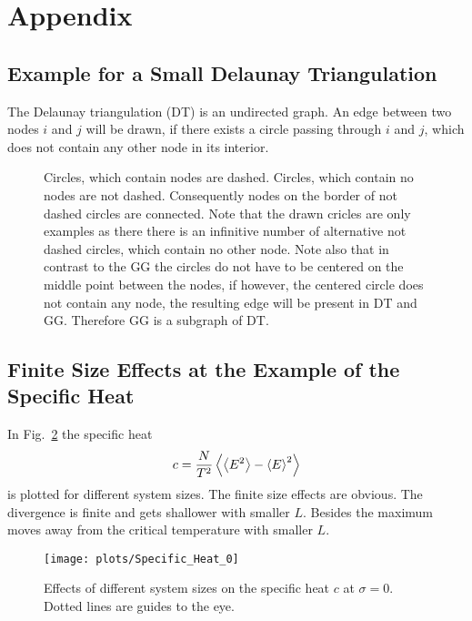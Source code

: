 \section{Appendix}
\subsection{Example for a Small Delaunay Triangulation}
\label{appendix:DT_def}
    The Delaunay triangulation (DT) is an undirected graph. An edge
    between two nodes \(i\) and \(j\) will be drawn, if there exists
    a circle passing through \(i\) and \(j\), which does not contain
    any other node in its interior.
    \begin{figure}[htbp]
    \centering
        
        \label{sfig:def:DT}
        \caption[Example for a Small Delaunay Triangulation]
        {
            Circles, which contain nodes are dashed.
            Circles, which contain no nodes are not dashed.
            Consequently nodes on the border of not dashed circles are
            connected. Note that the drawn cricles are only examples
            as there there is an infinitive number of alternative not
            dashed circles, which contain no other node.
            Note also that in contrast to the GG the circles do not
            have to be centered on the middle point between the nodes, if
            however, the centered circle does not contain any node, the
            resulting edge will be present in DT and GG. Therefore GG is
            a subgraph of DT.
        }
    \end{figure}

\subsection{Finite Size Effects at the Example of the Specific Heat}
\label{appendix:finiteSizeEffects}
    In Fig.\ \ref{fig:smeared_out_appendix} the specific heat
    \begin{equation}
        c = \frac{N}{T^2}\left< \left< E^2 \right> - \left< E \right>^2 \right>
    \end{equation}
    is plotted for different system sizes. The finite size effects are obvious.
    The divergence is finite and gets shallower with smaller \(L\). Besides
    the maximum moves away from the critical temperature with smaller \(L\).
    \begin{figure}[htbp]
        \centering
        \texttt{[image: plots/Specific\_Heat\_0]}
        \caption[Finite Size Effects by Example of the Specific Heat]
        {
            Effects of different system sizes on the specific heat \(c\)
            at \(\sigma = 0\). Dotted lines are guides to the eye.
        }
        \label{fig:smeared_out_appendix}
    \end{figure}

